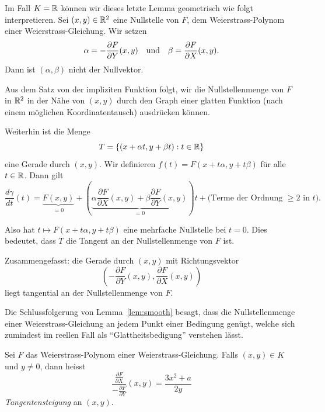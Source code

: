 \begin{bemerkung}
  \label{bem:tangente}
  Im Fall $K={\mathbb{R}}$ können wir dieses letzte Lemma geometrisch wie folgt
  interpretieren.
  Sei $(x,y)\in{\mathbb{R}}^2$ eine Nullstelle von $F$, dem Weierstrass-Polynom
  einer Weierstrass-Gleichung. Wir setzen
  $$\alpha = -\frac{\partial F}{\partial Y}(x,y) \quad\text{und}\quad
  \beta = \frac{\partial F}{\partial X}(x,y).$$
  Dann ist $(\alpha,\beta)$ nicht der Nullvektor.

  Aus dem Satz von der impliziten Funktion folgt, wir die
  Nullstellenmenge von $F$ in ${\mathbb{R}}^2$ in der Nähe von $(x,y)$ durch
  den Graph einer glatten Funktion (nach einem möglichen Koordinatentausch)
  ausdrücken können. 

  Weiterhin ist die Menge
  \begin{equation*}
    T = \{(x+\alpha t,y+\beta t) : t\in{\mathbb{R}}\}
  \end{equation*}
  eine Gerade durch $(x,y)$. Wir definieren $f(t) =
  F(x+t\alpha,y+t\beta)$ für alle $t\in{\mathbb{R}}$. 
  Dann gilt 
  \begin{equation*}
    \frac{d\gamma}{dt}(t)
    = \underbrace{F(x,y)}_{=0} + \left(\underbrace{\alpha \frac{\partial F}{\partial X}(x,y)
    +\beta \frac{\partial F}{\partial Y}(x,y)}_{=0}\right)t + \text{(Terme der
      Ordnung $\ge 2$ in $t$)}.
  \end{equation*}
  
  Also hat $t\mapsto F(x+t\alpha,y+t\beta)$ eine mehrfache Nullstelle
  bei $t=0$. Dies bedeutet, dass $T$ die Tangent an der
  Nullstellenmenge von $F$ ist.

  Zusammengefasst: die Gerade durch $(x,y)$ mit Richtungsvektor
  \begin{equation*}
    \left(-\frac{\partial F}{\partial Y}(x,y),\frac{\partial F}{\partial X}(x,y)\right)
  \end{equation*}
  liegt tangential an der Nullstellenmenge von $F$.
\end{bemerkung}

Die Schlussfolgerung von Lemma~\ref{lem:smooth} besagt, dass die
Nullstellenmenge einer Weierstrass-Gleichung an jedem Punkt einer
Bedingung genügt, welche sich zumindest im reellen Fall
als ``Glattheitsbedigung'' verstehen lässt.

\begin{definition}
  \label{def:tangentensteigung}
  Sei $F$ das Weierstrass-Polynom einer Weierstrass-Gleichung. Falls
  $(x,y)\in K$ und $y\not=0$, dann heisst
  \begin{equation*}
    \frac{\frac{\partial F}{\partial X}}{-\frac{\partial F}{\partial
        Y}}(x,y) = \frac{3x^2+a}{2y}
  \end{equation*}
  \emph{Tangentensteigung} an $(x,y)$. 
\end{definition}

